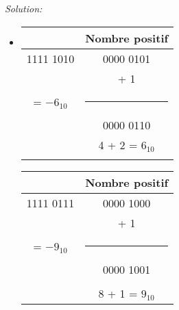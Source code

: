 \documentclass{article}
\newenvironment{solution}
    {\textit{Solution:}}
    {}
\begin{document}
\begin{solution}
\begin{itemize}
        
        \item
        
        
        \begin{tabular}{|c|c|}
        \hline
        & Nombre positif\\
        \hline    
        1111 1010           &       0000 0101                   \\
        \hspace{101pt}      &       + \hspace{25pt} 1           \\
        = $-6_{10}$         &       \rule{1in}{1pt}             \\
        \hspace{5pt}        &       0000 0110                   \\
        \hspace{5pt}        &       4 + 2 = $6_{10}$            \\
                            &       \hspace{100pt}              \\
        \hline
        \end{tabular}
        
        \hspace{40pt}
        
        \begin{tabular}{|c|c|}
        \hline
        & Nombre positif\\
        \hline    
        1111 0111                   &       0000 1000           \\
                                    &       + \hspace{25pt} 1   \\
        = $-9_{10}$                 &       \rule{1in}{1pt}     \\
        \hspace{5pt}                &       0000 1001           \\
        \hspace{100pt}              &       \hspace{100pt}      \\
                                    &       8 + 1 = $9_{10}$    \\
        \hline
        \end{tabular}
        
        \hspace{40pt}
        

\end{itemize}
\end{solution}
\end{document}
